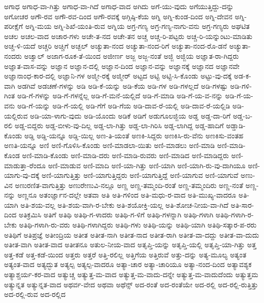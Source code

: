 {ಅಗಾಧ
ಅಗಾಧ-ವಾ-ಗಿತ್ತು
ಅಗಾಧ-ವಾ-ಗಿದೆ
ಅಗಾಧ-ವಾದ
ಅಗಿದು
ಅಗೆ-ಯು-ವುದು
ಅಗೆಯುತ್ತಿದ್ದು-ದನ್ನು
ಅಗೋಚರ
ಅಗೌ-ರವ
ಅಗೌ-ರವ-ದಿಂದ
ಅಗೌ-ರವಕ್ಕೆ
ಅಗ್ಗಿಷ್ಠಿ-ಕೆಯ
ಅಗ್ನಿ
ಅಗ್ನಿ-ಕುಂಡ-ದಿಂದ
ಅಗ್ನಿ-ದೇವನ
ಅಗ್ನಿ-ಪರೀಕ್ಷೆಗೆ
ಅಗ್ನಿ-ಮಯ
ಅಗ್ನಿ-ಶಿಖೆ-ಯಂತಿ-ರುವ
ಅಗ್ನಿಯ
ಅಗ್ರ-ಗಣ್ಯ
ಅಗ್ರ-ಗಣ್ಯ-ನಾಗು-ವನು
ಅಗ್ರ-ಗಣ್ಯರು
ಅಘಟಿತ
ಅಚಲ
ಅಚಲ-ವಾದ
ಅಚಾರ-ಗಳು
ಅಚೇ-ತ-ನದ
ಅಚೇ-ತನ
ಅಚ್ಚ
ಅಚ್ಚ-ರಿ-ಪಟ್ಟರು
ಅಚ್ಚ-ರಿ-ಯನ್ನುಂಟು-ಮಾಡಿತು
ಅಚ್ಚ-ಳಿ-ಯದೆ
ಅಚ್ಚರಿ
ಅಚ್ಚಿಗೆ
ಅಚ್ಬಲ್
ಅಚ್ಯುತಾ-ನಂದ
ಅಚ್ಯುತಾ-ನಂದ-ರಿಗೆ
ಅಚ್ಯುತಾ-ನಂದ-ರೊ-ಡನೆ
ಅಚ್ಯುತಾ-ನಂದರು
ಅಚ್ವಾಲ್
ಅಜಾಗ-ರೂಕ-ತೆ-ಯಿಂದ
ಅಜೀರ್ಣ
ಅಜ್ಜ
ಅಜ್ಜ-ನಂತೆ
ಅಜ್ಜಿ
ಅಜ್ಜಿಯ
ಅಜ್ಞಾತ-ರಾ-ಗಿದ್ದರು
ಅಜ್ಞಾತ-ವಾಸ-ವನ್ನು
ಅಜ್ಞಾನ
ಅಜ್ಞಾನ-ದಲ್ಲಿ
ಅಜ್ಞಾನ-ದಿಂದ
ಅಜ್ಞಾನ-ವನ್ನು
ಅಜ್ಞಾನಕ್ಕೆ
ಅಜ್ಞಾನದ
ಅಜ್ಞಾನವೇ
ಅಜ್ಞಾನಾಂಧ-ಕಾರ-ದಲ್ಲಿ
ಅಜ್ಞಾನಿ-ಗಳ
ಅಜ್ಮೀ-ರಕ್ಕೆ
ಅಜ್ಮೀರ್
ಅಟ್ಟದ
ಅಟ್ಟಿ
ಅಟ್ಟಿ-ಸಿ-ಕೊಂಡು
ಅಟ್ಟು-ವು-ದಕ್ಕೆ
ಅಡ-ಕ-ವಾಗಿ
ಅಡಗಿವೆ
ಅಡಚಣೆ-ಗಳನ್ನು
ಅಡಿ
ಅಡಿ-ಕೆ-ಯನ್ನು
ಅಡಿ-ಕೆಯ
ಅಡಿ-ಗಳ
ಅಡಿ-ಗಳಲ್ಲದೆ
ಅಡಿ-ಗಳಷ್ಟು
ಅಡಿ-ಗಳಿ-ಗಿಂತ
ಅಡಿ-ಗೆ-ಗಳನ್ನು
ಅಡಿ-ಗೆ-ಗಳನ್ನೆಲ್ಲ
ಅಡಿ-ಗೆ-ಮನೆ-ಯಲ್ಲಿದೆ
ಅಡಿ-ಗೆ-ಮಾಡಿ
ಅಡಿ-ಗೆ-ಯ-ವ-ನನ್ನು
ಅಡಿ-ಗೆ-ಯ-ವನು
ಅಡಿ-ಗೆ-ಯನ್ನು
ಅಡಿ-ಗೆ-ಯಲ್ಲಿ
ಅಡಿ-ಗೆಗೆ
ಅಡಿ-ಗೆಯ
ಅಡಿ-ದಾವ-ರೆ-ಯಲ್ಲಿ
ಅಡಿ-ದಾವ-ರೆ-ಯಲ್ಲಿಡಿ
ಅಡಿ-ಯಲ್ಲಿರುವ
ಅಡಿ-ಯಾ-ಳಾಗು-ವುದು
ಅಡಿ-ಯೊಂದು
ಅಡಿಕೆ
ಅಡಿಗೆ
ಅಡುಗೂಲಜ್ಜಿಯ
ಅಡ್ಡ
ಅಡ್ಡ-ದಾ-ರಿಗೆ
ಅಡ್ಡ-ಬ-ರಲಿ
ಅಡ್ಡ-ಬಿದ್ದರು
ಅಡ್ಡ-ಬೀಳು-ವು-ದಿಲ್ಲ
ಅಡ್ಡ-ಲಾ-ಗಿತ್ತು
ಅಡ್ಡ-ಲಾ-ಗಿರಿಸಿ
ಅಡ್ಡ-ಲಾಗಿದ್ದ
ಅಡ್ಡ-ಹಾದಿಗೆ
ಅಡ್ಡಾಡಿ-ಕೊಂಡು
ಅಡ್ಡಿ
ಅಡ್ಡಿ-ಯನ್ನೂ
ಅಡ್ಡಿ-ಯಿಲ್ಲ
ಅಣ-ತಿ-ಯಂತೆ
ಅಣಕಿ-ಸಿದ್ದರು
ಅಣಕಿಸಿ-ರು-ವೆನು
ಅಣಕಿಸು-ವಂತಹ
ಅಣತಿ-ಯನ್ನೂ
ಅಣಿ
ಅಣಿ-ಗೊಳಿಸಿ-ಕೊಂಡು
ಅಣಿ-ಮಾಡಲಾ-ಯಿತು
ಅಣಿ-ಮಾಡಲು
ಅಣಿ-ಮಾಡಿ
ಅಣಿ-ಮಾಡಿ-ಕೊಂಡ
ಅಣಿ-ಮಾಡಿ-ಕೊಂಡು
ಅಣಿ-ಮಾಡಿ-ದರು
ಅಣಿ-ಮಾಡಿ-ರುವರು
ಅಣಿ-ಮಾಡಿದ
ಅಣಿ-ಮಾಡಿದ್ದರು
ಅಣಿ-ಮಾಡುತ್ತಾ-ರೆಂದೂ
ಅಣಿ-ಮಾಡುವ
ಅಣಿ-ಮಾದಿ
ಅಣಿ-ಯಾ-ಗಿತ್ತು
ಅಣಿ-ಯಾಗಿ
ಅಣಿ-ಯಾಗಿ-ರು-ವು-ದಾಗಿಯೂ
ಅಣಿ-ಯಾಗು-ವು-ದಕ್ಕೆ
ಅಣಿ-ಯಾಗುತ್ತಿತ್ತು
ಅಣಿ-ಯಾಗುತ್ತಿದ್ದರು
ಅಣಿ-ಯಾಗುತ್ತಿದ್ದೆ
ಅಣಿ-ಯಾಗುವ
ಅಣಿ-ಯಾಗುವೆ
ಅಣು-ವಿನ
ಅಣುರಣಿತ-ವಾಗುತ್ತಿತ್ತು
ಅಣುರೇಣುವಿ-ನಲ್ಲೂ
ಅಣ್ಣ
ಅಣ್ಣ-ತಮ್ಮಂದಿ-ರಂತೆ
ಅಣ್ಣ-ತಮ್ಮಂದಿರು
ಅಣ್ಣ-ನಂತೆ
ಅಣ್ಣ-ನನ್ನು
ಅಣ್ಣನೂ
ಅತಂರ್ಜ್ಞಾನ-ದಲ್ಲೇ
ಅತವಾ
ಅತಿ
ಅತಿ-ಗಳಿಂದ
ಅತಿ-ಮಧು-ರ-ವಾದ
ಅತಿ-ಮುಖ್ಯ-ವಾದರೂ
ಅತಿ-ಯಾಗಿ
ಅತಿ-ಶಯ-ವಲ್ಲ
ಅತಿ-ಶಯ-ವಾಗಿ-ರ-ಬೇಕು
ಅತಿ-ಶಯೋಕ್ತಿ-ಯಲ್ಲ
ಅತಿ-ಶೋಚ-ನೀಯ-ವಾ-ಗಿದೆ
ಅತಿ-ಸಾರ-ದಿಂದ
ಅತಿಕ್ರಮಿಸಿ
ಅತಿಗೆ
ಅತಿಥಿ
ಅತಿಥಿ-ಗ-ಳಾದರು
ಅತಿಥಿ-ಗ-ಳಿಗೆ
ಅತಿಥಿ-ಗಳನ್ನಾಗಿ
ಅತಿಥಿ-ಗಳಾಗಿ
ಅತಿಥಿ-ಗಳಾಗಿ-ರ-ಬೇಕು
ಅತಿಥಿ-ಗಳಾಗಿ-ರು-ವರು
ಅತಿಥಿ-ಗಳಾಗಿದ್ದರು
ಅತಿಥಿ-ಗಳು
ಅತಿಥಿ-ಯನ್ನು
ಅತಿಥಿ-ಯಾಗಿ
ಅತಿಥಿ-ಸತ್ಕಾರ-ಪ-ರರು
ಅತಿಥಿಗೆ
ಅತಿಪ್ರಜ್ಞೆ
ಅತೀಂದ್ರಿಯ
ಅತೀತ
ಅತೀತ-ನಾಗಿ
ಅತೀತ-ನಾದ
ಅತೀತ-ರಾಗಿ
ಅತೀತ-ವಾ-ದದ್ದು
ಅತೀತ-ವಾ-ದುದು
ಅತೀತ-ವಾಗಿ
ಅತೀತ-ವಾದ
ಅತೀತನೂ
ಅತುಲ-ನೀಯ-ವಾದ
ಅತೃಪ್ತಿ-ಯನ್ನು
ಅತೃಪ್ತಿ-ಯಲ್ಲಿ
ಅತೃಪ್ತಿ-ಯಾ-ಗಿತ್ತು
ಅತ್ತ
ಅತ್ತ-ಕಡೆ
ಅತ್ತ-ಕಡೆ-ಯಿಂದ
ಅತ್ತರು
ಅತ್ತರೆ
ಅತ್ತಿ-ರಲಿಲ್ಲ
ಅತ್ತಿಗೆಯ
ಅತ್ತಿರುವೆ
ಅತ್ತು-ದನ್ನು
ಅತ್ಯ-ಮೂಲ್ಯ
ಅತ್ಯಂತ
ಅತ್ಯಂತ-ವಾದ
ಅತ್ಯದ್ಭುತ
ಅತ್ಯಲ್ಪ
ಅತ್ಯಲ್ಪ-ವಾದರೂ
ಅತ್ಯಾ-ಚಾರ
ಅತ್ಯಾ-ಚಾರಿಯೂ
ಅತ್ಯಾ-ನಂದ-ದಿಂದ
ಅತ್ಯಾವಶ್ಯಕ
ಅತ್ಯಾಶ್ಚರ್ಯ-ಕರ-ವಾದ
ಅತ್ಯುಚ್ಚ
ಅತ್ಯುತ್ತ-ಮ-ವಾದ
ಅತ್ಯುತ್ತ-ಮ-ವಾದು-ದನ್ನೇ
ಅತ್ಯುತ್ತ-ಮ-ವಾದುದೆಂದು
ಅತ್ಯುತ್ತಮ
ಅತ್ಯುನ್ನತ
ಅತ್ಯುನ್ನತ-ವಾದ
ಅಥರ್ವ-ವೇದ
ಅಥವಾ
ಅಥೆನ್ಸ್
ಅದ-ರಂತೆ
ಅದ-ರಂತೆಯೇ
ಅದ-ರಲ್ಲಿ
ಅದ-ರಲ್ಲಿ-ರುತ್ತಿತ್ತು
ಅದ-ರಲ್ಲಿ-ರುವ
ಅದ-ರಲ್ಲಿದ
}
